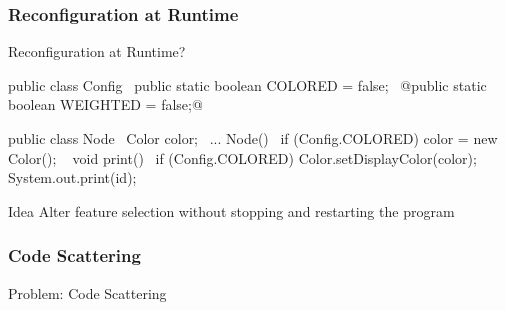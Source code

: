\subsubsection{Reconfiguration at Runtime}
\begin{frame}[fragile]{Reconfiguration at Runtime?}
	\begin{fancycolumns}[widths={45}]
		\small
\begin{codetight}{}
public class Config {
	~public static boolean COLORED = false;~
	@public static boolean WEIGHTED = false;@
}

\end{codetight}
\begin{codetight}{}
public class Node {
	~Color color;~
	...
	Node(){
		~if (Config.COLORED) {
			color = new Color();
		}~
	}
	void print() {
		~if (Config.COLORED) {
			Color.setDisplayColor(color);
		}~
		System.out.print(id);
	}
}
\end{codetight}
	\nextcolumn
		\begin{definition}{Idea}
			Alter feature selection without stopping and restarting the program
		\end{definition}
	\end{fancycolumns}
\end{frame}


\subsubsection{Code Scattering}
\begin{frame}{Problem: Code Scattering }
	\centering{}
\end{frame}

